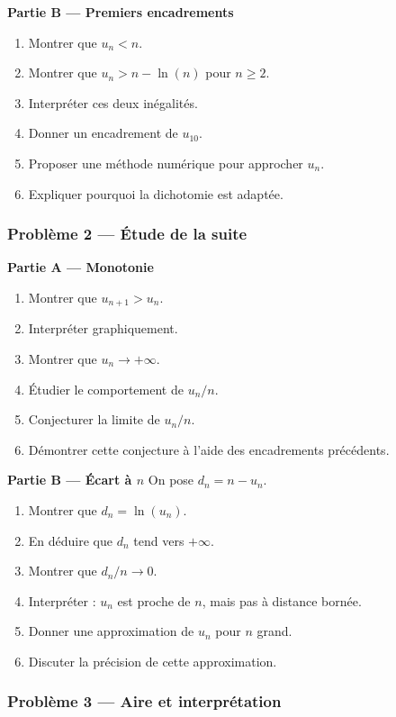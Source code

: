 \documentclass[11pt,a4paper]{article}
\begin{document}
\begin{difficile}
\textbf{Partie B — Premiers encadrements}
\begin{enumerate}
  \item Montrer que $u_n<n$.
  \item Montrer que $u_n>n-\ln(n)$ pour $n\geq2$.
  \item Interpréter ces deux inégalités.
  \item Donner un encadrement de $u_{10}$.
  \item Proposer une méthode numérique pour approcher $u_n$.
  \item Expliquer pourquoi la dichotomie est adaptée.
\end{enumerate}

\subsubsection*{Problème 2 — Étude de la suite}

\textbf{Partie A — Monotonie}
\begin{enumerate}
  \item Montrer que $u_{n+1}>u_n$.
  \item Interpréter graphiquement.
  \item Montrer que $u_n\to+\infty$.
  \item Étudier le comportement de $u_n/n$.
  \item Conjecturer la limite de $u_n/n$.
  \item Démontrer cette conjecture à l'aide des encadrements précédents.
\end{enumerate}

\textbf{Partie B — Écart à $n$}
On pose $d_n=n-u_n$.
\begin{enumerate}
  \item Montrer que $d_n=\ln(u_n)$.
  \item En déduire que $d_n$ tend vers $+\infty$.
  \item Montrer que $d_n/n\to0$.
  \item Interpréter : $u_n$ est proche de $n$, mais pas à distance bornée.
  \item Donner une approximation de $u_n$ pour $n$ grand.
  \item Discuter la précision de cette approximation.
\end{enumerate}

\subsubsection*{Problème 3 — Aire et interprétation}


\end{difficile}
\end{document}

